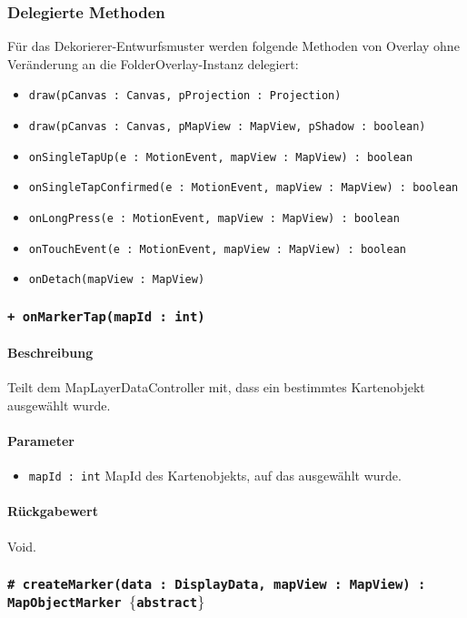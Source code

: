 \subsubsection*{Delegierte Methoden}
Für das Dekorierer-Entwurfsmuster werden folgende Methoden von Overlay ohne Veränderung 
an die FolderOverlay-Instanz delegiert:
\begin{itemize}
    \item \texttt{draw(pCanvas : Canvas, pProjection : Projection)}
    \item \texttt{draw(pCanvas : Canvas, pMapView : MapView, pShadow : boolean)}
    \item \texttt{onSingleTapUp(e : MotionEvent, mapView : MapView) : boolean}
    \item \texttt{onSingleTapConfirmed(e : MotionEvent, mapView : MapView) : boolean}
    \item \texttt{onLongPress(e : MotionEvent, mapView : MapView) : boolean}
    \item \texttt{onTouchEvent(e : MotionEvent, mapView : MapView) : boolean}
    \item \texttt{onDetach(mapView : MapView)}
\end{itemize}

\subsubsection*{\texttt{+ onMarkerTap(mapId : int)}}%
\paragraph*{Beschreibung}
Teilt dem MapLayerDataController mit, dass ein bestimmtes Kartenobjekt ausgewählt wurde.
\paragraph*{Parameter}
\begin{itemize}
    \item \texttt{mapId : int} MapId des Kartenobjekts, auf das ausgewählt wurde.
\end{itemize}
\paragraph*{Rückgabewert}
Void.

\subsubsection*{\texttt{\# createMarker(data : DisplayData, mapView : MapView) : MapObjectMarker $\lbrace$abstract$\rbrace$}}%
